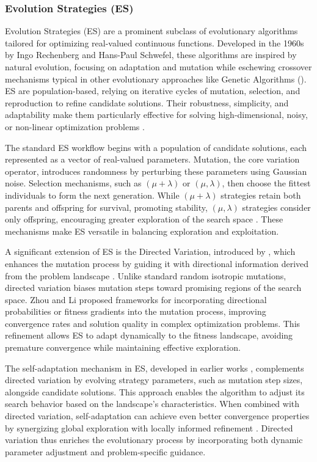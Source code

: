 \subsubsection*{Evolution Strategies (ES)}
Evolution Strategies (ES) are a prominent subclass of evolutionary algorithms tailored for optimizing real-valued continuous functions. Developed in the 1960s by Ingo Rechenberg and Hans-Paul Schwefel, these algorithms are inspired by natural evolution, focusing on adaptation and mutation while eschewing crossover mechanisms typical in other evolutionary approaches like Genetic Algorithms (\cite{vent1975rechenberg,schwefel1977numerische}). ES are population-based, relying on iterative cycles of mutation, selection, and reproduction to refine candidate solutions. Their robustness, simplicity, and adaptability make them particularly effective for solving high-dimensional, noisy, or non-linear optimization problems \parencite{beyer2002evolution}.

The standard ES workflow begins with a population of candidate solutions, each represented as a vector of real-valued parameters. Mutation, the core variation operator, introduces randomness by perturbing these parameters using Gaussian noise. Selection mechanisms, such as \((\mu+\lambda)\) or \((\mu,\lambda)\), then choose the fittest individuals to form the next generation. While $(\mu+\lambda)$ strategies retain both parents and offspring for survival, promoting stability, \((\mu,\lambda)\) strategies consider only offspring, encouraging greater exploration of the search space \parencite{schwefel1993evolution}. These mechanisms make ES versatile in balancing exploration and exploitation.

A significant extension of ES is the Directed Variation, introduced by \textcite{zhou2003directed}, which enhances the mutation process by guiding it with directional information derived from the problem landscape \parencite{zhou2003directed}. Unlike standard random isotropic mutations, directed variation biases mutation steps toward promising regions of the search space. Zhou and Li proposed frameworks for incorporating directional probabilities or fitness gradients into the mutation process, improving convergence rates and solution quality in complex optimization problems. This refinement allows ES to adapt dynamically to the fitness landscape, avoiding premature convergence while maintaining effective exploration.

The self-adaptation mechanism in ES, developed in earlier works \parencite{schwefel1981numerical}, complements directed variation by evolving strategy parameters, such as mutation step sizes, alongside candidate solutions. This approach enables the algorithm to adjust its search behavior based on the landscape's characteristics. When combined with directed variation, self-adaptation can achieve even better convergence properties by synergizing global exploration with locally informed refinement \parencite{beyer2001theory}. Directed variation thus enriches the evolutionary process by incorporating both dynamic parameter adjustment and problem-specific guidance.

